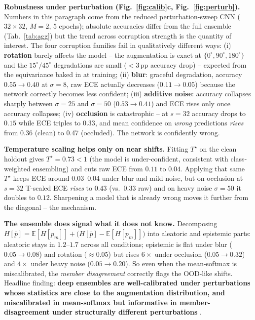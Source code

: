 \documentclass[10pt,a4paper]{article}
\begin{document}
\textbf{Robustness under perturbation (Fig.~\ref{fig:calib}c, Fig.~\ref{fig:perturb}).} Numbers in this paragraph come from the reduced perturbation-sweep CNN ($32\!\times\!32$, $M{=}2$, 5 epochs); absolute accuracies differ from the full ensemble (Tab.~\ref{tab:agg}) but the trend across corruption strength is the quantity of interest. The four corruption families fail in qualitatively different ways: (i) \textbf{rotation} barely affects the model -- the augmentation is exact at $\{0^\circ,90^\circ,180^\circ\}$ and the $15^\circ/45^\circ$ degradations are small ($<3$\,pp accuracy drop) -- expected from the equivariance baked in at training; (ii) \textbf{blur}: graceful degradation, accuracy $0.55\!\to\!0.40$ at $\sigma{=}8$, raw ECE actually decreases ($0.11\!\to\!0.05$) because the network correctly becomes less confident; (iii) \textbf{additive noise}: accuracy collapses sharply between $\sigma{=}25$ and $\sigma{=}50$ ($0.53\!\to\!0.41$) and ECE rises only once accuracy collapses; (iv) \textbf{occlusion} is catastrophic -- at $s{=}32$ accuracy drops to $0.15$ while ECE triples to $0.33$, and mean confidence on \emph{wrong} predictions \emph{rises} from 0.36 (clean) to 0.47 (occluded). The network is confidently wrong.

\textbf{Temperature scaling helps only on near shifts.} Fitting $T^\star$ on the clean holdout gives $T^\star{=}0.73{<}1$ (the model is under-confident, consistent with class-weighted ensembling) and cuts raw ECE from $0.11$ to $0.04$. Applying that same $T^\star$ keeps ECE around $0.03\text{--}0.04$ under blur and mild noise, but on occlusion at $s{=}32$ T-scaled ECE \emph{rises} to $0.43$ (vs.\ $0.33$ raw) and on heavy noise $\sigma{=}50$ it doubles to $0.12$. Sharpening a model that is already wrong moves it further from the diagonal -- the \citet{ovadia2019} mechanism.

\textbf{The ensemble does signal what it does not know.} Decomposing $H[\bar p]=\mathbb{E}[H[p_m]]+\big(H[\bar p]-\mathbb{E}[H[p_m]]\big)$ into aleatoric and epistemic parts: aleatoric stays in $1.2\text{--}1.7$ across all conditions; epistemic is flat under blur ($0.05\!\to\!0.08$) and rotation ($\approx\!0.05$) but rises $6{\times}$ under occlusion ($0.05\!\to\!0.32$) and $4{\times}$ under heavy noise ($0.05\!\to\!0.20$). So even when the mean-softmax is miscalibrated, the \emph{member disagreement} correctly flags the OOD-like shifts. Headline finding: \textbf{deep ensembles are well-calibrated under perturbations whose statistics are close to the augmentation distribution, and miscalibrated in mean-softmax but informative in member-disagreement under structurally different perturbations} \citep{lakshminarayanan2017,ovadia2019}.
\end{document}
